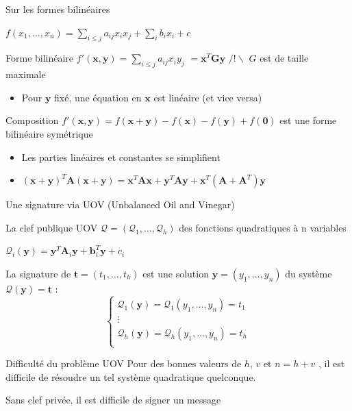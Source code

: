 \begin{frame}{Sur les formes bilinéaires}

$f(x_1,\dots,x_n) = \underset{i\leq j}{\displaystyle\sum} a_{ij}x_ix_j + \underset{i}{\displaystyle\sum} b_{i}x_i + c$
    \begin{block}{Forme bilinéaire}             
        $f'(\textbf{x},\textbf{y}) = \underset{i\leq j}{\displaystyle\sum} a_{ij}x_i y_j$ \pause $= \textbf{x}^T \textbf{G} \textbf{y}$ \pause \hfill $/!\backslash$ $\textbf{}G$ est de taille maximale
    \end{block}
    \pause
    \begin{itemize}
        \item Pour $\textbf{y}$ fixé, une équation en $\textbf{x}$ est linéaire (et vice versa)
    \end{itemize}
    \pause
    \begin{block}{Composition}
        $f'(\textbf{x},\textbf{y})=f(\textbf{x}+\textbf{y})-f(\textbf{x}) - f(\textbf{y})+f(\textbf{0})$ est une forme bilinéaire symétrique
    \end{block}

    \begin{itemize}
      \item  Les parties linéaires et constantes se simplifient
      \item $(\textbf{x}+\textbf{y})^T \textbf{A}(\textbf{x}+\textbf{y}) = \textbf{x}^T\textbf{A}\textbf{x}+\textbf{y}^T\textbf{A}\textbf{y}+\textbf{x}^T(\textbf{A}+\textbf{A}^T)\textbf{y}$
    \end{itemize}
    
\end{frame}

\begin{frame}{Une signature via UOV (Unbalanced Oil and Vinegar)}
    
    \begin{block}{La clef publique UOV}
        $\mathcal{Q}=(\mathcal{Q}_1,\dots,\mathcal{Q}_h)$ des fonctions quadratiques à n variables

        $\mathcal{Q}_i(\textbf{y}) = \textbf{y}^T\textbf{A}_i\textbf{y} + \textbf{b}_i^T\textbf{y} + c_i $
    \end{block}
    \pause
    La signature de $\textbf{t}=(t_1,\dots,t_h)$ est une solution $\textbf{y}=(y_1,\dots,y_n)$ du système $\mathcal{Q}(\textbf{y})=\textbf{t}$ :
    \[\left\{
    \begin{array}{c}
       \mathcal{Q}_1(\textbf{y}) =  \mathcal{Q}_1(y_1,\dots,y_n) = t_1 \\
       \vdots \\
       \mathcal{Q}_h(\textbf{y}) =  \mathcal{Q}_h(y_1,\dots,y_n) = t_h \\
    \end{array}
    \right.\]
    \pause
    \begin{block}{Difficulté du problème UOV}
        Pour des bonnes valeurs de $h$, $v$ et $n=h+v$ , il est difficile de résoudre un tel système quadratique quelconque.
    \end{block}
    \pause
    Sans clef privée, il est difficile de signer un message
\end{frame}


